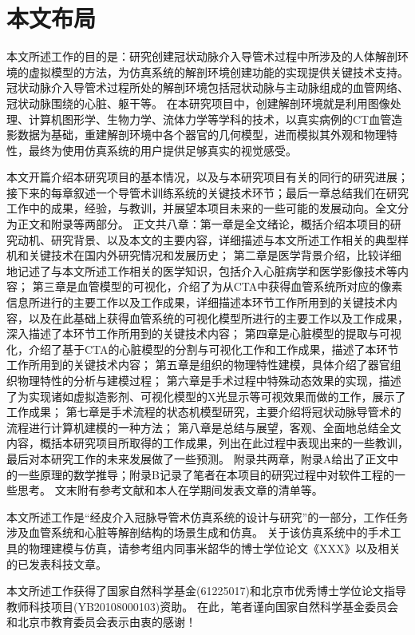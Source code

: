 \section{本文布局}
\label{sec1-5}

本文所述工作的目的是：研究创建冠状动脉介入导管术过程中所涉及的人体解剖环境的虚拟模型的方法，为仿真系统的解剖环境创建功能的实现提供关键技术支持。
冠状动脉介入导管术过程所处的解剖环境包括冠状动脉与主动脉组成的血管网络、冠状动脉围绕的心脏、躯干等。
在本研究项目中，创建解剖环境就是利用图像处理、计算机图形学、生物力学、流体力学等学科的技术，以真实病例的CT血管造影数据为基础，重建解剖环境中各个器官的几何模型，进而模拟其外观和物理特性，最终为使用仿真系统的用户提供足够真实的视觉感受。

本文开篇介绍本研究项目的基本情况，以及与本研究项目有关的同行的研究进展；接下来的每章叙述一个导管术训练系统的关键技术环节；最后一章总结我们在研究工作中的成果，经验，与教训，并展望本项目未来的一些可能的发展动向。全文分为正文和附录等两部分。
正文共八章：第一章是全文绪论，概括介绍本项目的研究动机、研究背景、以及本文的主要内容，详细描述与本文所述工作相关的典型样机和关键技术在国内外研究情况和发展历史；
第二章是医学背景介绍，比较详细地记述了与本文所述工作相关的医学知识，包括介入心脏病学和医学影像技术等内容；
第三章是血管模型的可视化，介绍了为从CTA中获得血管系统所对应的像素信息所进行的主要工作以及工作成果，详细描述本环节工作所用到的关键技术内容，以及在此基础上获得血管系统的可视化模型所进行的主要工作以及工作成果，深入描述了本环节工作所用到的关键技术内容；
第四章是心脏模型的提取与可视化，介绍了基于CTA的心脏模型的分割与可视化工作和工作成果，描述了本环节工作所用到的关键技术内容；
第五章是组织的物理特性建模，具体介绍了器官组织物理特性的分析与建模过程；
第六章是手术过程中特殊动态效果的实现，描述了为实现诸如虚拟造影剂、可视化模型的X光显示等可视效果而做的工作，展示了工作成果；
第七章是手术流程的状态机模型研究，主要介绍将冠状动脉导管术的流程进行计算机建模的一种方法；
第八章是总结与展望，客观、全面地总结全文内容，概括本研究项目所取得的工作成果，列出在此过程中表现出来的一些教训，最后对本研究工作的未来发展做了一些预测。
附录共两章，附录A给出了正文中的一些原理的数学推导；附录B记录了笔者在本项目的研究过程中对软件工程的一些思考。
文末附有参考文献和本人在学期间发表文章的清单等。

本文所述工作是“经皮介入冠脉导管术仿真系统的设计与研究”的一部分，工作任务涉及血管系统和心脏等解剖结构的场景生成和仿真。
关于该仿真系统中的手术工具的物理建模与仿真，请参考组内同事米韶华的博士学位论文《XXX》以及相关的已发表科技文章。

本文所述工作获得了国家自然科学基金(61225017)和北京市优秀博士学位论文指导教师科技项目(YB20108000103)资助。
在此，笔者谨向国家自然科学基金委员会和北京市教育委员会表示由衷的感谢！ 
